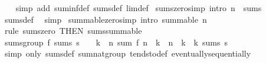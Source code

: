 \begin{isabellebody}
%
\isadelimproof
\ \ %
\endisadelimproof
%
\isatagproof
{}\isamarkupfalse%
\ {\isacharparenleft}{\kern0pt}simp\ add{\isacharcolon}{\kern0pt}\ suminf{\isacharunderscore}{\kern0pt}def\ sums{\isacharunderscore}{\kern0pt}def\ lim{\isacharunderscore}{\kern0pt}def{\isacharparenright}{\kern0pt}%
\endisatagproof
{\isafoldproof}%
%
\isadelimproof
\isanewline
%
\endisadelimproof
\isanewline
{}\isamarkupfalse%
\ sums{\isacharunderscore}{\kern0pt}zero{\isacharbrackleft}{\kern0pt}simp{\isacharcomma}{\kern0pt}\ intro{\isacharbrackright}{\kern0pt}{\isacharcolon}{\kern0pt}\ {\isachardoublequoteopen}{\isacharparenleft}{\kern0pt}{\isasymlambda}n{\isachardot}{\kern0pt}\ {}{\isacharparenright}{\kern0pt}\ sums\ {}{\isachardoublequoteclose}\isanewline
%
\isadelimproof
\ \ %
\endisadelimproof
%
\isatagproof
{}\isamarkupfalse%
\ sums{\isacharunderscore}{\kern0pt}def\ \isamarkupfalse%
\ simp%
\endisatagproof
{\isafoldproof}%
%
\isadelimproof
\isanewline
%
\endisadelimproof
\isanewline
{}\isamarkupfalse%
\ summable{\isacharunderscore}{\kern0pt}zero{\isacharbrackleft}{\kern0pt}simp{\isacharcomma}{\kern0pt}\ intro{\isacharbrackright}{\kern0pt}{\isacharcolon}{\kern0pt}\ {\isachardoublequoteopen}summable\ {\isacharparenleft}{\kern0pt}{\isasymlambda}n{\isachardot}{\kern0pt}\ {}{\isacharparenright}{\kern0pt}{\isachardoublequoteclose}\isanewline
%
\isadelimproof
\ \ %
\endisadelimproof
%
\isatagproof
{}\isamarkupfalse%
\ {\isacharparenleft}{\kern0pt}rule\ sums{\isacharunderscore}{\kern0pt}zero\ {\isacharbrackleft}{\kern0pt}THEN\ sums{\isacharunderscore}{\kern0pt}summable{\isacharbrackright}{\kern0pt}{\isacharparenright}{\kern0pt}%
\endisatagproof
{\isafoldproof}%
%
\isadelimproof
\isanewline
%
\endisadelimproof
\isanewline
{}\isamarkupfalse%
\ sums{\isacharunderscore}{\kern0pt}group{\isacharcolon}{\kern0pt}\ {\isachardoublequoteopen}f\ sums\ s\ {\isasymLongrightarrow}\ {}\ {\isacharless}{\kern0pt}\ k\ {\isasymLongrightarrow}\ {\isacharparenleft}{\kern0pt}{\isasymlambda}n{\isachardot}{\kern0pt}\ sum\ f\ {\isacharbraceleft}{\kern0pt}n\ {\isacharasterisk}{\kern0pt}\ k\ {\isachardot}{\kern0pt}{\isachardot}{\kern0pt}{\isacharless}{\kern0pt}\ n\ {\isacharasterisk}{\kern0pt}\ k\ {\isacharplus}{\kern0pt}\ k{\isacharbraceright}{\kern0pt}{\isacharparenright}{\kern0pt}\ sums\ s{\isachardoublequoteclose}\isanewline
%
\isadelimproof
\ \ %
\endisadelimproof
%
\isatagproof
{}\isamarkupfalse%
\ {\isacharparenleft}{\kern0pt}simp\ only{\isacharcolon}{\kern0pt}\ sums{\isacharunderscore}{\kern0pt}def\ sum{\isachardot}{\kern0pt}nat{\isacharunderscore}{\kern0pt}group\ tendsto{\isacharunderscore}{\kern0pt}def\ eventually{\isacharunderscore}{\kern0pt}sequentially{\isacharparenright}{\kern0pt}\isanewline

\end{isabellebody}
